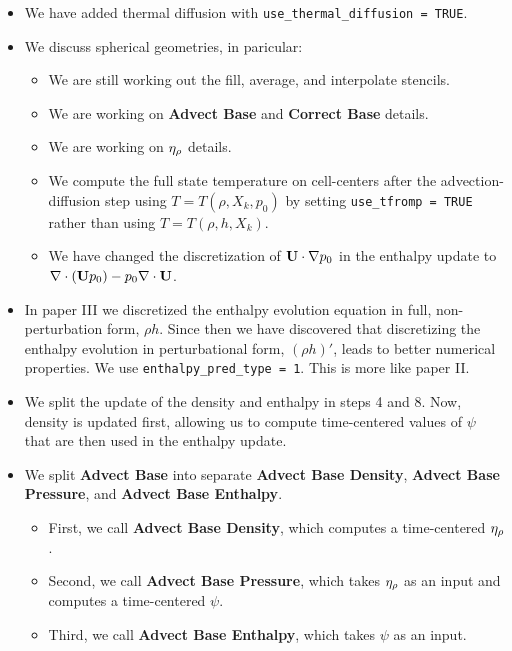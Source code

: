 \begin{itemize}

\item We have added thermal diffusion with {\tt use\_thermal\_diffusion = TRUE}.

\item We discuss spherical geometries, in paricular:
\begin{itemize}
\item We are still working out the fill, average, and interpolate stencils.
\item We are working on {\bf Advect Base} and {\bf Correct Base} details.
\item We are working on $\eta_{\rho}$ details.
\item We compute the full state temperature on cell-centers after the 
advection-diffusion step using $T=T(\rho,X_k,p_0)$ by setting 
{\tt use\_tfromp = TRUE} rather than using $T=T(\rho,h,X_k)$.
\item We have changed the discretization of ${\bf U}\cdot\nabla p_0$ in the enthalpy
update to $\nabla\cdot({\bf U} p_0) - p_0\nabla\cdot{\bf U}$.
\end{itemize}

\item In paper III we discretized the enthalpy evolution equation in
full, non-perturbation form, $\rho h$.  Since then we have discovered that 
discretizing the enthalpy evolution in perturbational form, $(\rho h)'$,
leads to better numerical properties.  We use {\tt enthalpy\_pred\_type = 1}.
This is more like paper II.

\item We split the update of the density and enthalpy in steps 4 and 8.
Now, density is updated first, allowing us to compute time-centered values of 
$\psi$ that are then used in the enthalpy update.

\item We split {\bf Advect Base} into separate {\bf Advect Base Density},
{\bf Advect Base Pressure}, and {\bf Advect Base Enthalpy}.
\begin{itemize}
\item First, we call {\bf Advect Base Density}, which computes a time-centered
$\eta_{\rho}$.
\item Second, we call {\bf Advect Base Pressure}, which takes $\eta_{\rho}$ as an
input and computes a time-centered $\psi$.
\item Third, we call {\bf Advect Base Enthalpy}, which takes $\psi$ as an input.
\end{itemize}


\end{itemize}
